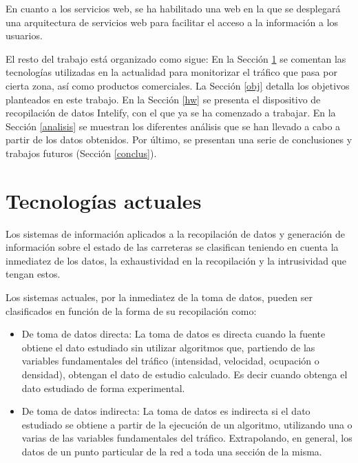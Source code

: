 \documentclass[twocolumn,twoside]{Jornadas}
\begin{document}


En cuanto a los servicios web, se ha habilitado una web en la que se desplegará una arquitectura de servicios web para facilitar el acceso a la información a los usuarios.


El resto del trabajo está organizado como sigue:
En la Sección \ref{soa} se comentan las tecnologías utilizadas en la actualidad para monitorizar el tráfico que pasa por cierta zona, así como productos comerciales.
La Sección \ref{obj} detalla los objetivos planteados en este trabajo.
En la Sección \ref{hw} se presenta el dispositivo de recopilación de datos Intelify, con el que ya se ha comenzado a trabajar.
En la Sección \ref{analisis} se muestran los diferentes análisis que se han llevado a cabo a partir de los datos obtenidos.
Por último, se presentan una serie de conclusiones y trabajos futuros (Sección \ref{conclus}).


\section{Tecnologías actuales}
\label{soa}


Los sistemas de información aplicados a la recopilación de datos y generación de información sobre el estado de las carreteras 
se clasifican teniendo en cuenta la inmediatez de los datos, la exhaustividad en la recopilación y la intrusividad que tengan estos.

Los sistemas actuales, por la inmediatez de la toma de datos, pueden ser clasificados en función de la forma de su recopilación como:

\begin{itemize}
 \item De toma de datos directa: La toma de datos es directa cuando la fuente obtiene el dato estudiado sin utilizar algoritmos que, partiendo de las variables 
fundamentales del tráfico (intensidad, velocidad, ocupación o densidad), obtengan el dato de estudio calculado. Es decir cuando obtenga el dato estudiado de forma experimental.

 \item De toma de datos indirecta: La toma de datos es indirecta si el dato estudiado se obtiene a partir de la ejecución de un algoritmo, utilizando una o 
varias de las variables fundamentales del tráfico. Extrapolando, en general, los datos de un punto particular de la red a toda una sección de la misma.
\end{itemize}
\end{document}
